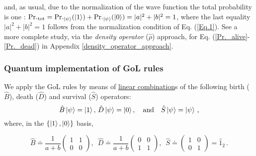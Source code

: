 \documentclass[11pt]{article}
\numberwithin{equation}{section} %
\numberwithin{figure}{section} %
\begin{document}
and, as usual, due to the normalization of the wave function  the total probability is one \cite[p.~107, Eq.~(3.48)]{Griffiths}: $\textrm{Pr.}_{\textrm{tot}}=\textrm{Pr.}_{\ket{\psi}} (\ket{1})+\textrm{Pr.}_{\ket{\psi}} (\ket{0}) = |a|^2+|b|^2=1$, where the last equality $|a|^2+|b|^2=1$ follows from the normalization condition of Eq. (\ref{Eq.1}). See a more complete study, via the \emph{density operator} ($\hat{\rho}$) approach, for Eq. (\ref{Pr._alive}-\ref{Pr._dead}) in Appendix \ref{density_operator_approach}.


\subsubsection{Quantum implementation of GoL rules }

We apply the GoL rules by means of \uline{linear combination}s of the following birth ($\hat{B}$), death ($\hat{D}$) and survival ($\hat{S}$) operators: \cite[p.~2, Eq.~(3)]{Flitney}
\begin{equation} \label{Eq.2}
\hat{B}\ket{\psi}=\ket{1},\, \hat{D}\ket{\psi}=\ket{0},\quad\textrm{and}\quad \hat{S}\ket{\psi}=\ket{\psi}\,\textrm{,}
\end{equation}
where, in the $\{\ket{1},\ket{0}\}$ basis,

\begin{equation} \label{Eq.3}
\hat{B}\doteq \frac{1}{a+b}\begin{pmatrix} 1 & 1 \\ 0 & 0 \end{pmatrix},\,\,\,\hat{D}\doteq   \frac{1}{a+b}\begin{pmatrix} 0 & 0 \\ 1 & 1 \end{pmatrix},\,\,\,\hat{S}\doteq  \begin{pmatrix} 1 & 0 \\ 0 & 1 \end{pmatrix}=\hat{1}_2\,\textrm{.}
\end{equation}

\vspace{0.3cm}
\end{document}

